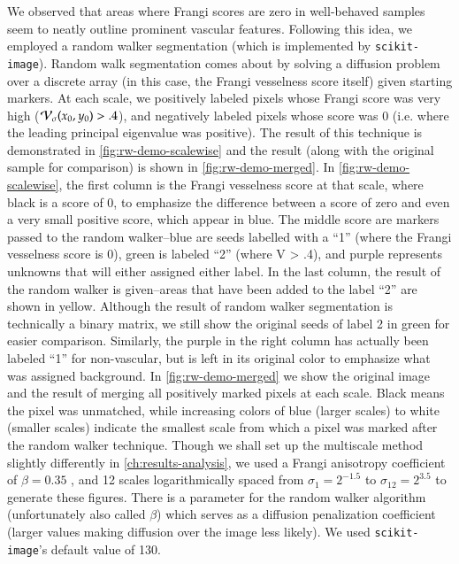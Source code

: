 We observed that areas where Frangi scores are zero in well-behaved samples seem to neatly outline prominent vascular features. Following this idea, we employed a random walker segmentation \cite{Grady-Random-Walks} (which is implemented by \texttt{scikit-image}). Random walk segmentation comes about by solving a diffusion problem over a discrete array (in this case, the Frangi vesselness score itself) given starting markers. At each scale, we positively labeled pixels whose Frangi score was very high ($\mathcal{V}_{\sigma}(x_0,y_0) > .4$), and negatively labeled pixels whose score was $0$ (i.e. where the leading principal eigenvalue was positive). The result of this technique is demonstrated in \cref{fig:rw-demo-scalewise} and the result (along with the original sample for comparison) is shown in \cref{fig:rw-demo-merged}.
In \cref{fig:rw-demo-scalewise}, the first column is the Frangi vesselness score at that scale, where black is a score of 0, to emphasize the difference between a score of zero and even a very small positive score, which appear in blue. The middle score are markers passed to the random walker--blue are seeds labelled with a ``1'' (where the Frangi vesselness score is 0), green is labeled ``2'' (where V > .4), and purple represents unknowns that will either assigned either label. In the last column, the result of the random walker is given--areas that have been added to the label ``2'' are shown in yellow. Although the result of random walker segmentation is technically a binary matrix, we still show the original seeds of label 2 in green for easier comparison. Similarly, the purple in the right column has actually been labeled ``1'' for non-vascular, but is left in its original color to emphasize what was assigned background. In \cref{fig:rw-demo-merged} we show the original image and the result of merging all positively marked pixels at each scale. Black means the pixel was unmatched, while increasing colors of blue (larger scales) to white (smaller scales) indicate the smallest scale from which a pixel was marked after the random walker technique.  Though we shall set up the multiscale method slightly differently in \cref{ch:results-analysis}, we used a Frangi anisotropy coefficient of $\beta=0.35$ , and 12 scales logarithmically spaced from $\sigma_1 = 2^{-1.5} $ to $\sigma_{12} = 2^{3.5}$ to generate these figures. There is a parameter for the random walker algorithm (unfortunately also called $\beta$) which serves as a diffusion penalization coefficient (larger values making diffusion over the image less likely). We used \texttt{scikit-image}'s default value of 130. 

